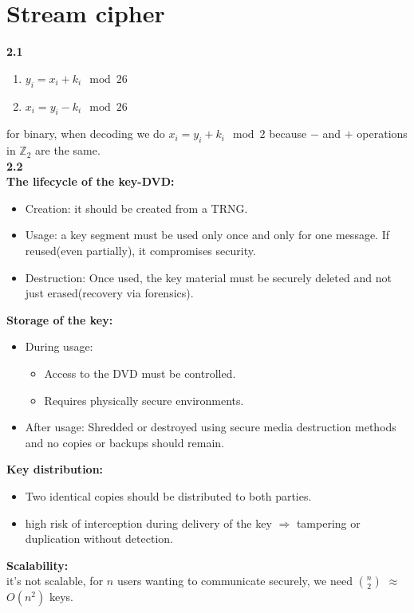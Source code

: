 \section{Stream cipher}

\textbf{2.1}
\begin{enumerate}
    \item $y_i = x_i + k_i \mod{26}$
    \item $x_i = y_i - k_i \mod{26}$
\end{enumerate}
for binary, when decoding we do $x_i = y_i + k_i \mod{2}$ because $-$ and $+$ operations in $\mathbb{Z}_2$ are the same.\\
\textbf{2.2}\\
\textbf{The lifecycle of the key-DVD:}
\begin{itemize}
    \item Creation: it should be created from a TRNG.
    \item Usage: a key segment must be used only once and only for one message. If reused(even partially), it compromises security.
    \item Destruction: Once used, the key material must be securely deleted and not just erased(recovery via forensics).
\end{itemize}
\textbf{Storage of the key:}
\begin{itemize}
    \item During usage: \begin{itemize}
        \item Access to the DVD must be controlled.
        \item Requires physically secure environments.
    \end{itemize}
    \item After usage: Shredded or destroyed using secure media destruction methods and no copies or backups should remain.
\end{itemize}
\textbf{Key distribution:}
\begin{itemize}
    \item Two identical copies should be distributed to both parties.
    \item  high risk of interception during delivery of the key $\Rightarrow$ tampering or duplication without detection. 
\end{itemize}
\textbf{Scalability:}\\
it's not scalable, for $n$ users wanting to communicate securely, we need $\binom{n}{2}$ $\approx$ $O(n^2)$ keys.\\

